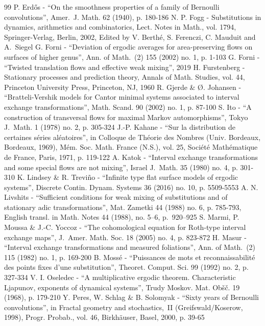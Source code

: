 \documentclass[10pt]{amsart}
\theoremstyle{plain}
\theoremstyle{definition}
\begin{document}
\begin{thebibliography}{99}
 P. Erdős - “On the smoothness properties of a family of Bernoulli convolutions”, Amer. J. Math. 62 (1940), p. 180-186
 N. P. Fogg - Substitutions in dynamics, arithmetics and combinatorics, Lect. Notes in Math., vol. 1794, Springer-Verlag, Berlin, 2002, Edited by V. Berthé, S. Ferenczi, C. Mauduit and A. Siegel
 G. Forni - “Deviation of ergodic averages for area-preserving flows on surfaces of higher genus”, Ann. of Math. (2) 155 (2002) no. 1, p. 1-103
 G. Forni - “Twisted translation flows and effective weak mixing”, 2019
 H. Furstenberg - Stationary processes and prediction theory, Annals of Math. Studies, vol. 44, Princeton University Press, Princeton, NJ, 1960
 R. Gjerde \& Ø. Johansen - “Bratteli-Vershik models for Cantor minimal systems associated to interval exchange transformations”, Math. Scand. 90 (2002) no. 1, p. 87-100
 S. Ito - “A construction of transversal flows for maximal Markov automorphisms”, Tokyo J. Math. 1 (1978) no. 2, p. 305-324
 J.-P. Kahane - “Sur la distribution de certaines séries aléatoires”, in Colloque de Théorie des Nombres (Univ. Bordeaux, Bordeaux, 1969), Mém. Soc. Math. France (N.S.), vol. 25, Société Mathématique de France, Paris, 1971, p. 119-122
 A. Katok - “Interval exchange transformations and some special flows are not mixing”, Israel J. Math. 35 (1980) no. 4, p. 301-310
 K. Lindsey \& R. Treviño - “Infinite type flat surface models of ergodic systems”, Discrete Contin. Dynam. Systems 36 (2016) no. 10, p. 5509-5553
 A. N. Livshits - “Sufficient conditions for weak mixing of substitutions and of stationary adic transformations”, Mat. Zametki 44 (1988) no. 6, p. 785-793, English transl. in Math. Notes 44 (1988), no. 5–6, p. 920–925
 S. Marmi, P. Moussa \& J.-C. Yoccoz - “The cohomological equation for Roth-type interval exchange maps”, J. Amer. Math. Soc. 18 (2005) no. 4, p. 823-872
 H. Masur - “Interval exchange transformations and measured foliations”, Ann. of Math. (2) 115 (1982) no. 1, p. 169-200
 B. Mossé - “Puissances de mots et reconnaissabilité des points fixes d’une substitution”, Theoret. Comput. Sci. 99 (1992) no. 2, p. 327-334
 V. I. Oseledec - “A multiplicative ergodic theorem. Characteristic Ljapunov, exponents of dynamical systems”, Trudy Moskov. Mat. Obšč. 19 (1968), p. 179-210
 Y. Peres, W. Schlag \& B. Solomyak - “Sixty years of Bernoulli convolutions”, in Fractal geometry and stochastics, II (Greifswald/Koserow, 1998), Progr. Probab., vol. 46, Birkhäuser, Basel, 2000, p. 39-65

\end{thebibliography}
\end{document}

